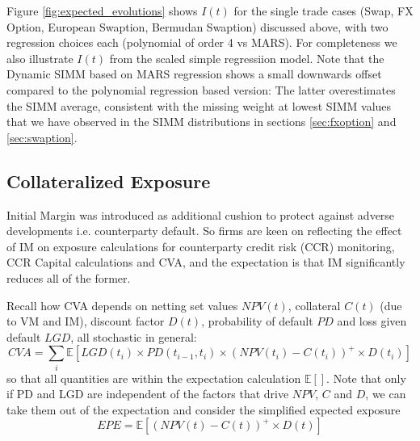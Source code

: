 \documentclass[11pt,a4paper,oneside]{article}
\newcommand{\PD}{\mathit{PD}}
\newcommand{\CVA}{\mathit{CVA}}
\newcommand{\EPE}{\mathit{EPE}}
\newcommand\E{\ensuremath{\mathbb{E}}}
\begin{document}
Figure \ref{fig:expected_evolutions} shows $I(t)$ for the single trade cases (Swap, FX Option, European Swaption, Bermudan Swaption) discussed above,
with two regression choices each (polynomial of order 4 vs MARS). For completeness we also illustrate $I(t)$ from the scaled simple regressiion model.
Note that the Dynamic SIMM based on MARS regression shows a small downwards offset compared to the polynomial regression based version: The latter
overestimates the SIMM average, consistent with the missing weight at lowest SIMM values that we have observed in the SIMM distributions in sections
\ref{sec:fxoption} and \ref{sec:swaption}.


\subsection{Collateralized Exposure}

Initial Margin was introduced as additional cushion to protect against adverse developments i.e. counterparty default. So firms are keen on reflecting the
effect of IM on exposure calculations for counterparty credit risk (CCR) monitoring, CCR Capital calculations and CVA, and the expectation is that IM significantly
reduces all of the former.

Recall how CVA depends on netting set values $NPV(t)$, collateral $C(t)$ (due to VM and IM), discount factor $D(t)$, probability of default $PD$
and loss given default $LGD$, all stochastic in general:
$$
\CVA = \sum_{i} \E\left[LGD(t_i) \times \PD(t_{i-1},t_i)\times (NPV(t_i)-C(t_i))^+\times D(t_i) \right] 
$$
so that all quantities are within the expectation calculation $\E[]$. Note that only if PD and LGD are independent of the factors that drive $NPV$, $C$ and $D$, we can take
them out of the expectation and consider the simplified expected exposure
$$
 \EPE = \E\left[ (NPV(t)-C(t))^+\times D(t) \right] 
$$
\end{document}
